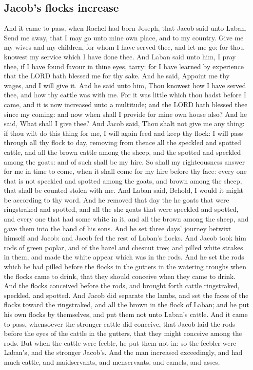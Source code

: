\begin{biblechapter}
\section*{Jacob's flocks increase}
\verse And it came to pass, when Rachel had born Joseph, that Jacob said unto Laban, Send me away, that I may go unto mine own place, and to my country.
\verse Give me my wives and my children, for whom I have served thee, and let me go: for thou knowest my service which I have done thee.
\verse And Laban said unto him, I pray thee, if I have found favour in thine eyes, tarry: for I have learned by experience that the LORD hath blessed me for thy sake.
\verse And he said, Appoint me thy wages, and I will give it.
\verse And he said unto him, Thou knowest how I have served thee, and how thy cattle was with me.
\verse For it was little which thou hadst before I came, and it is now increased unto a multitude; and the LORD hath blessed thee since my coming: and now when shall I provide for mine own house also?
\verse And he said, What shall I give thee? And Jacob said, Thou shalt not give me any thing: if thou wilt do this thing for me, I will again feed and keep thy flock:
\verse I will pass through all thy flock to day, removing from thence all the speckled and spotted cattle, and all the brown cattle among the sheep, and the spotted and speckled among the goats: and of such shall be my hire.
\verse So shall my righteousness answer for me in time to come, when it shall come for my hire before thy face: every one that is not speckled and spotted among the goats, and brown among the sheep, that shall be counted stolen with me.
\verse And Laban said, Behold, I would it might be according to thy word.
\verse And he removed that day the he goats that were ringstraked and spotted, and all the she goats that were speckled and spotted, and every one that had some white in it, and all the brown among the sheep, and gave them into the hand of his sons.
\verse And he set three days' journey betwixt himself and Jacob: and Jacob fed the rest of Laban's flocks.
\verse And Jacob took him rods of green poplar, and of the hazel and chesnut tree; and pilled white strakes in them, and made the white appear which was in the rods.
\verse And he set the rods which he had pilled before the flocks in the gutters in the watering troughs when the flocks came to drink, that they should conceive when they came to drink.
\verse And the flocks conceived before the rods, and brought forth cattle ringstraked, speckled, and spotted.
\verse And Jacob did separate the lambs, and set the faces of the flocks toward the ringstraked, and all the brown in the flock of Laban; and he put his own flocks by themselves, and put them not unto Laban's cattle.
\verse And it came to pass, whensoever the stronger cattle did conceive, that Jacob laid the rods before the eyes of the cattle in the gutters, that they might conceive among the rods.
\verse But when the cattle were feeble, he put them not in: so the feebler were Laban's, and the stronger Jacob's.
\verse And the man increased exceedingly, and had much cattle, and maidservants, and menservants, and camels, and asses.
\end{biblechapter}

